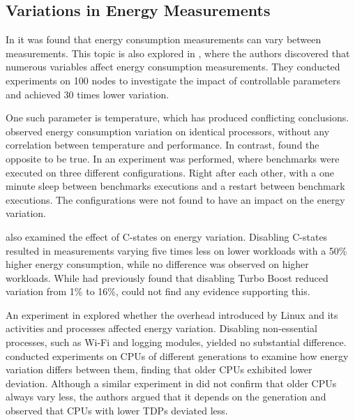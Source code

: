 \subsection{Variations in Energy Measurements}

In \cite{biksbois} it was found that energy consumption measurements can vary between measurements. This topic is also explored in \cite{Ournani2020}, where the authors discovered that numerous variables affect energy consumption measurements. They conducted experiments on 100 nodes to investigate the impact of controllable parameters and achieved 30 times lower variation.

One such parameter is temperature, which has produced conflicting conclusions. \cite{Kistowski2016} observed energy consumption variation on identical processors, without any correlation between temperature and performance. In contrast, \cite{Wang2018} found the opposite to be true. In \cite{Ournani2020} an experiment was performed, where benchmarks were executed on three different configurations. Right after each other, with a one minute sleep between benchmarks executions and a restart between benchmark executions. The configurations were not found to have an impact on the energy variation. 

\cite{Ournani2020} also examined the effect of C-states on energy variation. Disabling C-states resulted in measurements varying five times less on lower workloads with a 50\% higher energy consumption, while no difference was observed on higher workloads. While \cite{Acun2016} had previously found that disabling Turbo Boost reduced variation from 1\% to 16\%, \cite{Ournani2020} could not find any evidence supporting this.


An experiment in \cite{Ournani2020} explored whether the overhead introduced by Linux and its activities and processes affected energy variation. Disabling non-essential processes, such as Wi-Fi and logging modules, yielded no substantial difference. \cite{Marathe2017, Wang2019} conducted experiments on CPUs of different generations to examine how energy variation differs between them, finding that older CPUs exhibited lower deviation. Although a similar experiment in \cite{Ournani2020} did not confirm that older CPUs always vary less, the authors argued that it depends on the generation and observed that CPUs with lower TDPs deviated less.


